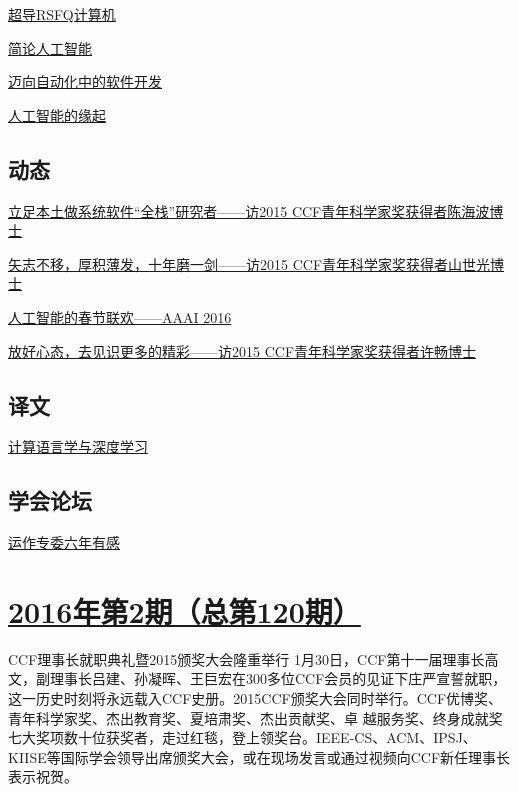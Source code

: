 \documentclass[a4paper]{article}
\begin{document}
\href{http://history.ccf.org.cn/resources/1190201776262/2016/03/14/8.pdf}{超导RSFQ计算机}

\href{http://history.ccf.org.cn/resources/1190201776262/2016/03/14/10.pdf}{简论人工智能}

\href{http://history.ccf.org.cn/resources/1190201776262/2016/03/14/11.pdf}{迈向自动化中的软件开发}

\href{http://history.ccf.org.cn/resources/1190201776262/2016/03/14/7.pdf}{人工智能的缘起}

\subsection{动态}
\href{http://history.ccf.org.cn/resources/1190201776262/2016/03/14/14.pdf}{立足本土做系统软件“全栈”研究者——访2015 CCF青年科学家奖获得者陈海波博士}

\href{http://history.ccf.org.cn/resources/1190201776262/2016/03/14/13.pdf}{矢志不移，厚积薄发，十年磨一剑——访2015 CCF青年科学家奖获得者山世光博士}

\href{http://history.ccf.org.cn/resources/1190201776262/2016/03/14/15.pdf}{人工智能的春节联欢——AAAI 2016}

\href{http://history.ccf.org.cn/resources/1190201776262/2016/03/14/12.pdf}{放好心态，去见识更多的精彩——访2015 CCF青年科学家奖获得者许畅博士}

\subsection{译文}
\href{http://history.ccf.org.cn/resources/1190201776262/2016/03/14/16.pdf}{计算语言学与深度学习}

\subsection{学会论坛}
\href{http://history.ccf.org.cn/resources/1190201776262/2016/03/14/17.pdf}{运作专委六年有感}


\section{\href{http://history.ccf.org.cn/sites/ccf/jsjtbbd.jsp?contentId=2908932108057}{\textbf{2016年第2期（总第120期）}}}
CCF理事长就职典礼暨2015颁奖大会隆重举行
1月30日，CCF第十一届理事长高文，副理事长吕建、孙凝晖、王巨宏在300多位CCF会员的见证下庄严宣誓就职，这一历史时刻将永远载入CCF史册。2015CCF颁奖大会同时举行。CCF优博奖、青年科学家奖、杰出教育奖、夏培肃奖、杰出贡献奖、卓
越服务奖、终身成就奖七大奖项数十位获奖者，走过红毯，登上领奖台。IEEE-CS、ACM、IPSJ、KIISE等国际学会领导出席颁奖大会，或在现场发言或通过视频向CCF新任理事长表示祝贺。
\end{document}
